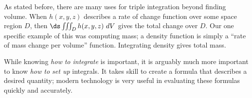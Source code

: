 As stated before, there are many uses for triple integration beyond finding volume. When $h(x,y,z)$ describes a rate of change function over some space region $D$, then $\ds \iiint_D h(x,y,z)\ dV$ gives the total change over $D$. Our one specific example of this was computing mass; a density function is simply a ``rate of mass change per volume'' function. Integrating density gives total mass.

While knowing \textit{how to integrate}  is important, it is arguably much more important to know \textit{how to set up} integrals. It takes skill to create a formula that describes a desired quantity; modern technology is very useful in evaluating these formulas quickly and accurately.

